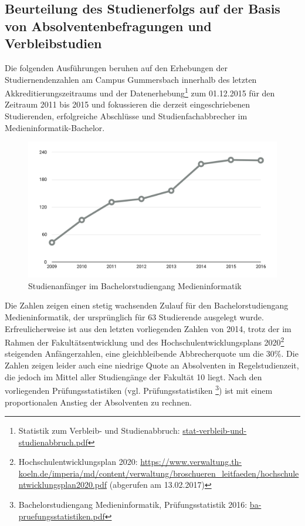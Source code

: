 \subsection{Beurteilung des Studienerfolgs auf der Basis von
Absolventenbefragungen und
Verbleibstudien}\label{beurteilung-des-studienerfolgs-auf-der-basis-von-absolventenbefragungen-und-verbleibstudien}

Die folgenden Ausführungen beruhen auf den Erhebungen der
Studiernendenzahlen am Campus Gummersbach innerhalb des letzten
Akkreditierungszeitraums und der Datenerhebung\footnote{Statistik zum
  Verbleib- und Studienabbruch:
  \href{https://th-koeln.github.io/mi-2017/anhaenge/stat-verbleib-und-studienabbruch.pdf}{stat-verbleib-und-studienabbruch.pdf}}
zum 01.12.2015 für den Zeitraum 2011 bis 2015 und fokussieren die
derzeit eingeschriebenen Studierenden, erfolgreiche Abschlüsse und
Studienfachabbrecher im Medieninformatik-Bachelor.

\begin{figure}[htbp]
\centering
\includegraphics[width=\columnwidth]{../anhaenge/bilder/ba-anfaengerzahlen.png}
\caption{Studienanfänger im Bachelorstudiengang Medieninformatik}
\end{figure}

Die Zahlen zeigen einen stetig wachsenden Zulauf für den
Bachelorstudiengang Medieninformatik, der ursprünglich für 63
Studierende ausgelegt wurde. Erfreulicherweise ist aus den letzten
vorliegenden Zahlen von 2014, trotz der im Rahmen der
Fakultätsentwicklung und des Hochschulentwicklungsplans 2020\footnote{Hochschulentwicklungsplan
  2020:
  \url{https://www.verwaltung.th-koeln.de/imperia/md/content/verwaltung/broschueren\_leitfaeden/hochschulentwicklungsplan2020.pdf}
  (abgerufen am 13.02.2017)} steigenden Anfängerzahlen, eine
gleichbleibende Abbrecherquote um die 30\%. Die Zahlen zeigen leider
auch eine niedrige Quote an Absolventen in Regelstudienzeit, die jedoch
im Mittel aller Studiengänge der Fakultät 10 liegt. Nach den
vorliegenden Prüfungsstatistiken (vgl. Prüfungsstatistiken \footnote{Bachelorstudiengang
  Medieninformatik, Prüfungsstatistik 2016:
  \href{https://th-koeln.github.io/mi-2017/anhaenge/ba-pruefungsstatistiken.pdf}{ba-pruefungsstatistiken.pdf}})
ist mit einem proportionalen Anstieg der Absolventen zu rechnen.

